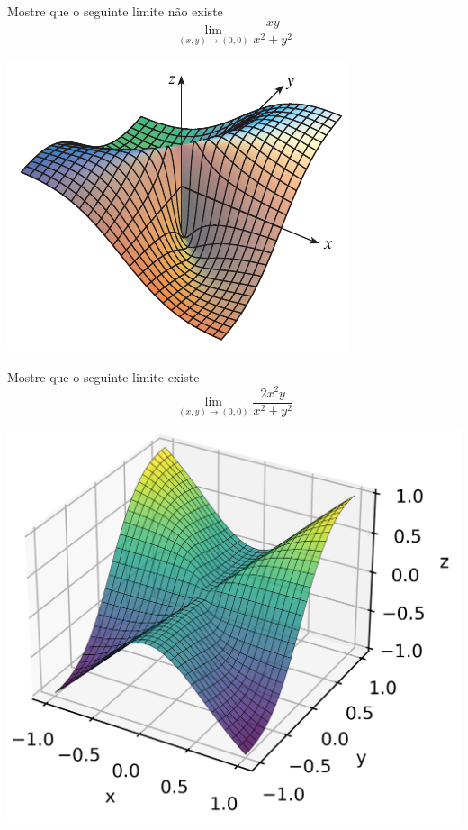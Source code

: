 \begin{frame}[label=limites]
	\begin{exe}
		Mostre que o seguinte limite não existe
		\[\lim_{(x,y)\to(0,0)}\frac{xy}{x^2+y^2}\]
	\end{exe}

	\begin{center}
	\includegraphics[scale=0.7]{figuras/lim2.png}
\end{center}
\end{frame}

\begin{frame}[label=limites]
	\begin{exe}
		Mostre que o seguinte limite existe
		\[\lim_{(x,y)\to(0,0)}\frac{2x^2y}{x^2+y^2}\]
	\end{exe}
	\begin{center}
	\includegraphics[scale=0.7]{figuras/lim3.png}
\end{center}
\end{frame}

